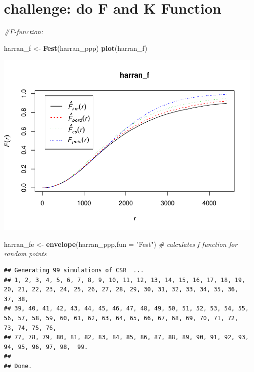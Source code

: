 \documentclass[]{article}
\newenvironment{Shaded}{\begin{snugshade}}{\end{snugshade}}
\newcommand{\KeywordTok}[1]{\textcolor[rgb]{0.13,0.29,0.53}{\textbf{{#1}}}}
\newcommand{\DataTypeTok}[1]{\textcolor[rgb]{0.13,0.29,0.53}{{#1}}}
\newcommand{\StringTok}[1]{\textcolor[rgb]{0.31,0.60,0.02}{{#1}}}
\newcommand{\CommentTok}[1]{\textcolor[rgb]{0.56,0.35,0.01}{\textit{{#1}}}}
\newcommand{\NormalTok}[1]{{#1}}
\begin{document}
\section{challenge: do F and K
Function}\label{challenge-do-f-and-k-function}

\begin{Shaded}
\begin{Highlighting}[]
\CommentTok{#F-function:}

\NormalTok{harran_f <-}\StringTok{ }\KeywordTok{Fest}\NormalTok{(harran_ppp)}
\KeywordTok{plot}\NormalTok{(harran_f)}
\end{Highlighting}
\end{Shaded}

\includegraphics{HarranPlain_files/figure-latex/unnamed-chunk-10-1.pdf}

\begin{Shaded}
\begin{Highlighting}[]
\NormalTok{harran_fe <-}\StringTok{ }\KeywordTok{envelope}\NormalTok{(harran_ppp,}\DataTypeTok{fun =} \StringTok{"Fest"}\NormalTok{) }\CommentTok{# calculates f function for random points}
\end{Highlighting}
\end{Shaded}

\begin{verbatim}
## Generating 99 simulations of CSR  ...
## 1, 2, 3, 4, 5, 6, 7, 8, 9, 10, 11, 12, 13, 14, 15, 16, 17, 18, 19, 20, 21, 22, 23, 24, 25, 26, 27, 28, 29, 30, 31, 32, 33, 34, 35, 36, 37, 38,
## 39, 40, 41, 42, 43, 44, 45, 46, 47, 48, 49, 50, 51, 52, 53, 54, 55, 56, 57, 58, 59, 60, 61, 62, 63, 64, 65, 66, 67, 68, 69, 70, 71, 72, 73, 74, 75, 76,
## 77, 78, 79, 80, 81, 82, 83, 84, 85, 86, 87, 88, 89, 90, 91, 92, 93, 94, 95, 96, 97, 98,  99.
## 
## Done.
\end{verbatim}
\end{document}
